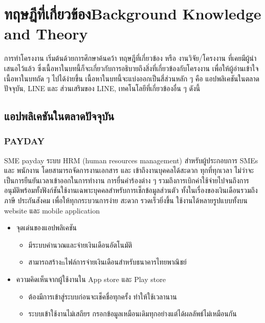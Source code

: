 \chapter{\ifcpe ทฤษฎีที่เกี่ยวข้อง\else Background Knowledge and Theory\fi}

\quad การทำโครงงาน เริ่มต้นด้วยการศึกษาค้นคว้า ทฤษฎีที่เกี่ยวข้อง หรือ งานวิจัย/โครงงาน ที่เคยมีผู้นําเสนอไว้แล้ว
ซึ่งเนื้อหาในบทนี้ก็จะเกี่ยวกับการอธิบายถึงสิ่งที่เกี่ยวข้องกับโครงงาน 
เพื่อให้ผู้อ่านเข้าใจเนื้อหาในบทถัด ๆ ไปได้ง่ายขึ้น เนื้อหาในบทนี้จะแบ่งออกเป็นสี่ส่วนหลัก ๆ คือ 
แอปพลิเคชันในตลาดปัจจุบัน, LINE และ ส่วนเสริมของ LINE, เทคโนโลยีที่เกี่ยวข้องอื่น ๆ ดังนี้ 
\section{แอปพลิเคชันในตลาดปัจจุบัน}

\subsection{PAYDAY}
\quad SME payday ระบบ HRM (human resources management) สำหรับผู้ประกอบการ SMEs และ พนักงาน 
โดยสามารถจัดการงานเอกสาร และ เข้าถึงงานบุคคลได้สะดวก ทุกที่ทุกเวลา ไม่ว่าจะเป็นการยืนยันเวลาเข้าออกในการทำงาน 
การยื่นคำร้องต่าง ๆ รวมถึงการเบิกค่าใช้จ่ายไปจนถึงการอนุมัติพร้อมทั้งฟังก์ชันใช้งานเฉพาะบุคคลสำหรับการเช็กข้อมูลส่วนตัว 
ทั้งในเรื่องของเงินเดือนรวมถึงภาษี ประกันสังคม เพื่อให้ทุกกระบวนการง่าย สะดวก รวดเร็วยิ่งขึ้น ใช้งานได้หลายรูปแบบทั้งบน website และ mobile application 
\cite{payday}
\begin{itemize}
  \item จุดเด่นของแอปพลิเคชัน
  \begin{itemize}
    \item มีระบบคำนวณและจ่ายเงินเดือนอัตโนมัติ
    \item สามารถสร้างnไฟล์การจ่ายเงินเดือนสำหรับธนาคารไทยพาณิชย์
  \end{itemize}
  \item ความคิดเห็นจากผู้ใช้งานใน App store และ Play store
  \begin{itemize}
    \item ต้องมีการเข้าสู่ระบบก่อนจะเช็คชื่อทุกครั้ง ทำให้ใช้เวลานาน
    \item ระบบเข้าใช้งานไม่เสถียร กรอกข้อมูลเหมือนเดิมทุกอย่างแต่ได้ผลลัพธ์ไม่เหมือนกัน
  \end{itemize}
\end{itemize}

